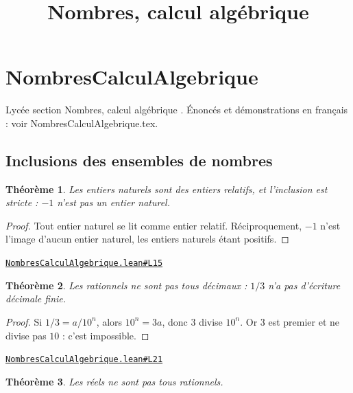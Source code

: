 \documentclass[11pt,a4paper]{article}
\title{Nombres, calcul algébrique}
\date{}
\theoremstyle{definition}
\theoremstyle{plain}
\newtheorem{theoreme}{Théorème}
\newcommand{\source}[2]{\par\smallskip\noindent\hfill{\footnotesize\href{#1}{\texttt{#2}}}\par\smallskip}
\begin{document}
\maketitle
\sloppy

\section{NombresCalculAlgebrique}

\noindent
Lycée \textemdash{} section \og{} Nombres, calcul algébrique \fg{}.
Énoncés et démonstrations en français : voir NombresCalculAlgebrique.tex.

\subsection{Inclusions des ensembles de nombres}

\begin{theoreme}
Les entiers naturels sont des entiers relatifs, et l'inclusion est stricte : $-1$ n'est
pas un entier naturel.
\end{theoreme}

\begin{proof}
Tout entier naturel se lit comme entier relatif. Réciproquement, $-1$ n'est l'image
d'aucun entier naturel, les entiers naturels étant positifs.
\end{proof}
\source{https://github.com/Commutator-IO/learn-lean/blob/main/courses/02-lycee/01-nombres-calcul-algebrique/NombresCalculAlgebrique.lean\#L15}{NombresCalculAlgebrique.lean\#L15}

\begin{theoreme}
Les rationnels ne sont pas tous décimaux : $1/3$ n'a pas d'écriture décimale finie.
\end{theoreme}

\begin{proof}
Si $1/3 = a/10^n$, alors $10^n = 3a$, donc $3$ divise $10^n$. Or $3$ est premier et ne
divise pas $10$ : c'est impossible.
\end{proof}
\source{https://github.com/Commutator-IO/learn-lean/blob/main/courses/02-lycee/01-nombres-calcul-algebrique/NombresCalculAlgebrique.lean\#L21}{NombresCalculAlgebrique.lean\#L21}

\begin{theoreme}
Les réels ne sont pas tous rationnels.
\end{theoreme}
\end{document}
